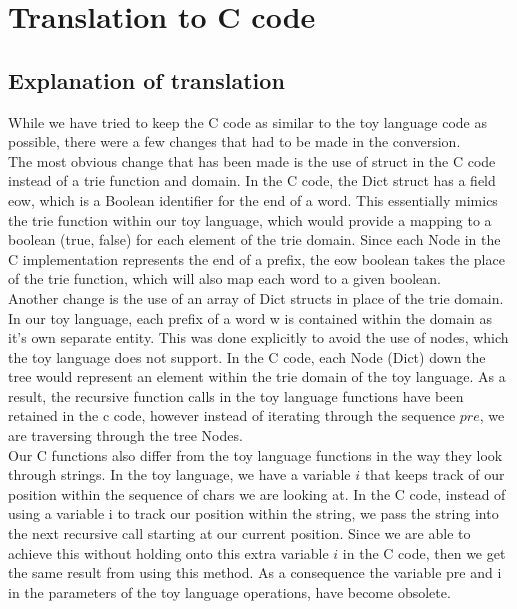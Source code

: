 \documentclass[a4paper,10pt,fleqn]{scrartcl}   	%
\begin{document}
\section{ Translation to C code }
\subsection{Explanation of translation}
While we have tried to keep the C code as similar to the toy language code as possible, there were a few changes that had to be made in the conversion. \\ 

The most obvious change that has been made is the use of struct in the C code instead of a trie function and domain. In the C code, the Dict struct has a field eow, which is a Boolean identifier for the end of a word. This essentially mimics the trie function within our toy language, which would provide a mapping to a boolean (true, false) for each element of the trie domain. Since each Node in the C implementation represents the end of a prefix, the eow boolean takes the place of the trie function, which will also map each word to a given boolean.\\

Another change is the use of an array of Dict structs in place of the trie domain. In our toy language, each prefix of a word w is contained within the domain as it's own separate entity. This was done explicitly to avoid the use of nodes, which the toy language does not support. In the C code, each Node (Dict) down the tree would represent an element within the trie domain of the toy language. As a result, the recursive function calls in the toy language functions have been retained in the c code, however instead of iterating through the sequence $pre$, we are traversing through the tree Nodes. \\

Our C functions also differ from the toy language functions in the way they look through strings. In the toy language, we have a variable $i$ that keeps track of our position within the sequence of chars we are looking at. In the C code, instead of using a variable i to track our position within the string, we pass the string into the next recursive call starting at our current position. Since we are able to achieve this without holding onto this extra variable $i$ in the C code, then we get the same result from using this method. As a consequence the variable pre and i in the parameters of the toy language operations, have become obsolete.\\ 
\end{document}
